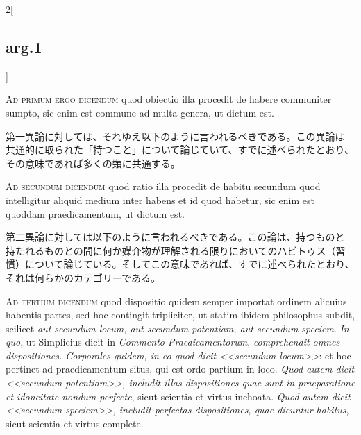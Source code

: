 \documentclass[paper=a4paper,fontsize=10pt,jafontsize=9pt,titlepage]{jlreq}
\begin{document}
\begin{paracol}{2}[\subsection{arg.1}]

{\scshape Ad primum ergo dicendum} quod obiectio illa procedit de habere
communiter sumpto, sic enim est commune ad multa genera, ut dictum
est.

\switchcolumn

第一異論に対しては、それゆえ以下のように言われるべきである。この異論は
共通的に取られた「持つこと」について論じていて、すでに述べられたとおり、
その意味であれば多くの類に共通する。

\switchcolumn*[\subsection{ad.2}]

{\scshape Ad secundum dicendum} quod ratio illa procedit de habitu
secundum quod intelligitur aliquid medium inter habens et id quod
habetur, sic enim est quoddam praedicamentum, ut dictum est.

\switchcolumn

第二異論に対しては以下のように言われるべきである。この論は、持つものと
持たれるものとの間に何か媒介物が理解される限りにおいてのハビトゥス（習
慣）について論じている。そしてこの意味であれば、すでに述べられたとおり、
それは何らかのカテゴリーである。

\switchcolumn*[\subsection{ad.3}]

{\scshape Ad tertium dicendum} quod dispositio quidem semper importat
ordinem alicuius habentis partes, sed hoc contingit tripliciter, ut
statim ibidem philosophus subdit, scilicet {\itshape aut secundum
locum, aut secundum potentiam, aut secundum speciem}. {\itshape In
quo}, ut Simplicius dicit in {\itshape Commento Praedicamentorum},
{\itshape comprehendit omnes dispositiones. Corporales quidem, in eo
quod dicit <<secundum locum>>}: et hoc pertinet ad praedicamentum
situs, qui est ordo partium in loco. {\itshape Quod autem dicit
<<secundum potentiam>>, includit illas dispositiones quae sunt in
praeparatione et idoneitate nondum perfecte}, sicut scientia et virtus
inchoata. {\itshape Quod autem dicit <<secundum speciem>>, includit
perfectas dispositiones, quae dicuntur habitus}, sicut scientia et
virtus complete.


\end{paracol}
\end{document}

